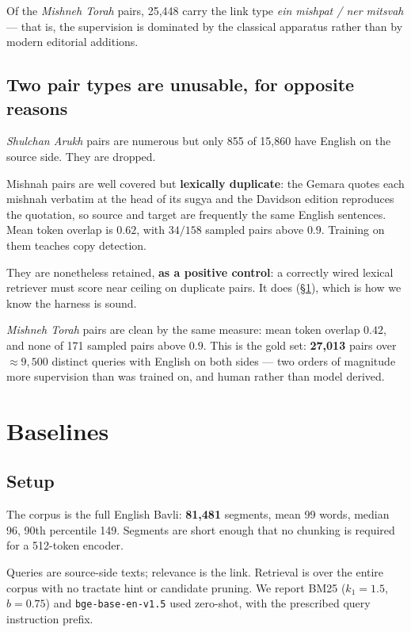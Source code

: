 \documentclass[11pt,a4paper]{article}
\begin{document}
Of the \emph{Mishneh Torah} pairs, 25{,}448 carry the link type \emph{ein
mishpat / ner mitsvah} --- that is, the supervision is dominated by the classical
apparatus rather than by modern editorial additions.

\subsection{Two pair types are unusable, for opposite reasons}

\emph{Shulchan Arukh} pairs are numerous but only 855 of 15{,}860 have English on
the source side. They are dropped.

Mishnah pairs are well covered but \textbf{lexically duplicate}: the Gemara
quotes each mishnah verbatim at the head of its sugya and the Davidson edition
reproduces the quotation, so source and target are frequently the same English
sentences. Mean token overlap is $0.62$, with $34/158$ sampled pairs above $0.9$.
Training on them teaches copy detection.

They are nonetheless retained, \textbf{as a positive control}: a correctly wired
lexical retriever must score near ceiling on duplicate pairs. It does
(\S\ref{sec:baselines}), which is how we know the harness is sound.

\emph{Mishneh Torah} pairs are clean by the same measure: mean token overlap
$0.42$, and none of 171 sampled pairs above $0.9$. This is the gold set:
\textbf{27{,}013} pairs over $\approx 9{,}500$ distinct queries with English on
both sides --- two orders of magnitude more supervision than \cite{mathembed}
was trained on, and human rather than model derived.

\section{Baselines}\label{sec:baselines}

\subsection{Setup}

The corpus is the full English Bavli: \textbf{81{,}481} segments, mean 99 words,
median 96, 90th percentile 149. Segments are short enough that no chunking is
required for a 512-token encoder.

Queries are source-side texts; relevance is the link. Retrieval is over the
entire corpus with no tractate hint or candidate pruning. We report BM25
($k_1=1.5$, $b=0.75$) and \texttt{bge-base-en-v1.5} \cite{bge} used zero-shot,
with the prescribed query instruction prefix.
\end{document}
